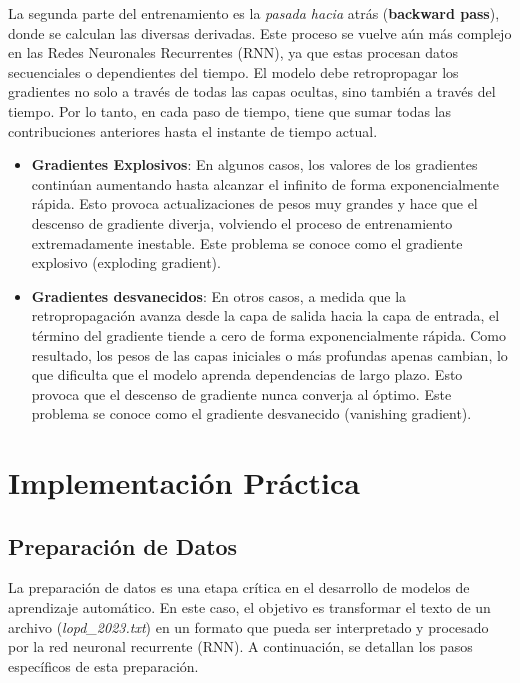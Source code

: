 \documentclass{article}
\begin{document}
La segunda parte del entrenamiento es la \textit{pasada hacia} atrás (\textbf{backward pass}), donde se calculan las diversas derivadas. Este proceso se vuelve aún más complejo en las Redes Neuronales Recurrentes (RNN), ya que estas procesan datos secuenciales o dependientes del tiempo. El modelo debe retropropagar los gradientes no solo a través de todas las capas ocultas, sino también a través del tiempo. Por lo tanto, en cada paso de tiempo, tiene que sumar todas las contribuciones anteriores hasta el instante de tiempo actual. \\

\begin{itemize}
    \item \textbf{Gradientes Explosivos}: En algunos casos, los valores de los gradientes continúan aumentando hasta alcanzar el infinito de forma exponencialmente rápida. Esto provoca actualizaciones de pesos muy grandes y hace que el descenso de gradiente diverja, volviendo el proceso de entrenamiento extremadamente inestable. Este problema se conoce como el gradiente explosivo (exploding gradient).
    \item \textbf{Gradientes desvanecidos}: En otros casos, a medida que la retropropagación avanza desde la capa de salida hacia la capa de entrada, el término del gradiente tiende a cero de forma exponencialmente rápida. Como resultado, los pesos de las capas iniciales o más profundas apenas cambian, lo que dificulta que el modelo aprenda dependencias de largo plazo. Esto provoca que el descenso de gradiente nunca converja al óptimo. Este problema se conoce como el gradiente desvanecido (vanishing gradient).
\end{itemize}

\newpage

\section{Implementación Práctica}
\subsection{Preparación de Datos}
La preparación de datos es una etapa crítica en el desarrollo de modelos de aprendizaje automático. En este caso, el objetivo es transformar el texto de un archivo (\textit{lopd\_2023.txt}) en un formato que pueda ser interpretado y procesado por la red neuronal recurrente (RNN). A continuación, se detallan los pasos específicos de esta preparación.
\end{document}

